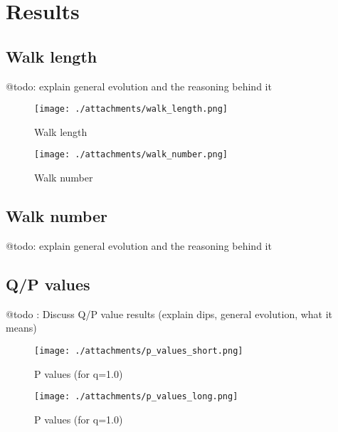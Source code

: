 \documentclass[a4paper,10pt]{article}
\begin{document}
\section{Results}

\subsection{Walk length}

@todo: explain general evolution and the reasoning behind it

\begin{figure}[!tbp]
  \centering
  \begin{minipage}[b]{0.49\textwidth}
    \texttt{[image: ./attachments/walk\_length.png]}
      \caption{Walk length}
      \label{fig:walk-length}
  \end{minipage}
  \hfill
  \begin{minipage}[b]{0.49\textwidth}
    \texttt{[image: ./attachments/walk\_number.png]}
      \caption{Walk number}
      \label{fig:walk-number}
  \end{minipage}
\end{figure}

\subsection{Walk number}

@todo: explain general evolution and the reasoning behind it

\subsection{Q/P values}

@todo : Discuss Q/P value results (explain dips, general evolution, what it means)

\begin{figure}[!tbp]
  \centering
  \begin{minipage}[b]{0.49\textwidth}
    \texttt{[image: ./attachments/p\_values\_short.png]}
    \caption{P values (for q=1.0)}
    \label{fig:q-values}
  \end{minipage}
  \hfill
  \begin{minipage}[b]{0.49\textwidth}
    \texttt{[image: ./attachments/p\_values\_long.png]}
    \caption{P values (for q=1.0)}
    \label{fig:p-values}
  \end{minipage}
\end{figure}
\end{document}
